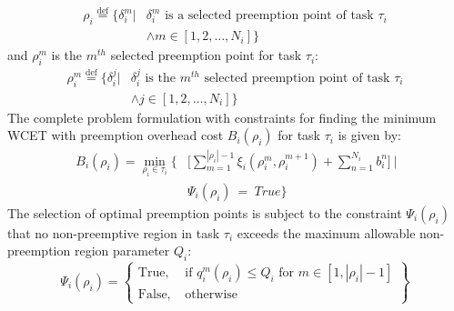 \begin{equation*}\label{eqn:pp-set}
\begin{split}
   \rho_{i} \stackrel{\text{def}}{=} \{\delta_{i}^{m}|&\delta_{i}^{m} \text{ is a selected preemption point of task } \tau_{i}\ \\ &\wedge m \in [1, 2, \ldots, N_{i}]\}
\end{split}
\end{equation*}
%
\noindent
and \begin{math}\rho_{i}^{m}\end{math} is the \textrm{$m^{th}$} selected preemption point for task \begin{math}\tau_{i}\end{math}:
\begin{equation*}\label{eqn:pp-mth}
\begin{split}
   \rho_{i}^{m} \stackrel{\text{def}}{=} \{\delta_{i}^{j}|&\delta_{i}^{j} \text{ is the $m^{th}$ selected preemption point of task } \tau_{i}\ \\ &\wedge j \in [1, 2, \ldots, N_{i}]\}
\end{split}
\end{equation*}
%
\noindent
The complete problem formulation with constraints for finding the minimum WCET with preemption overhead cost \begin{math}B_{i}(\rho_{i})\end{math} for task \begin{math}\tau_{i}\end{math} is given by:
\begin{equation}\label{eqn:global-bbkwcet-cost}
\begin{split}
   B_{i}(\rho_{i}) = \min_{\rho_{i} \in \tau_{i}} \Big\{&\Big[\sum_{m=1}^{|\rho_{i}|-1} \xi_{i}(\rho_{i}^{m},\rho_{i}^{m+1}) + \sum_{n=1}^{N_i}b_{i}^{n}\Big]\ |\\
   &\Psi_{i}(\rho_{i})\ =\ True\Big\}
\end{split}
\end{equation}
%
\noindent
The selection of optimal preemption points is subject to the constraint \begin{math}\Psi_{i}(\rho_{i})\end{math} that no non-preemptive region in task \begin{math}\tau_{i}\end{math} exceeds the maximum allowable non-preemption region parameter \begin{math}Q_{i}\end{math}: \begin{equation}\label{eqn:global-pp-constraint}
   \Psi_{i}(\rho_{i}) =
\left\{
\begin{array}{lr}
    \textrm{True, }&\textrm{if } q_{i}^{m}(\rho_{i}) \leq Q_{i} \textrm{ for } m \in [1,|\rho_{i}|-1] \\
    \textrm{False, }&\textrm{otherwise}
\end{array}
\right\}~
\end{equation}
